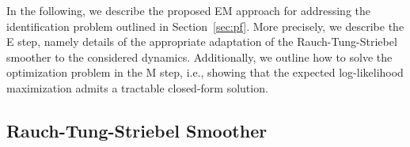In the following, we describe the proposed EM approach for addressing the identification problem outlined in Section~\ref{sec:pf}. More precisely, we describe the E step, namely details of the appropriate adaptation of the Rauch-Tung-Striebel smoother to the considered dynamics. Additionally, we outline how to solve the optimization problem in the M step, i.e., showing that the expected log-likelihood maximization admits a tractable closed-form solution.

\subsection{Rauch-Tung-Striebel Smoother}
\label{sec:RTS smoother}

